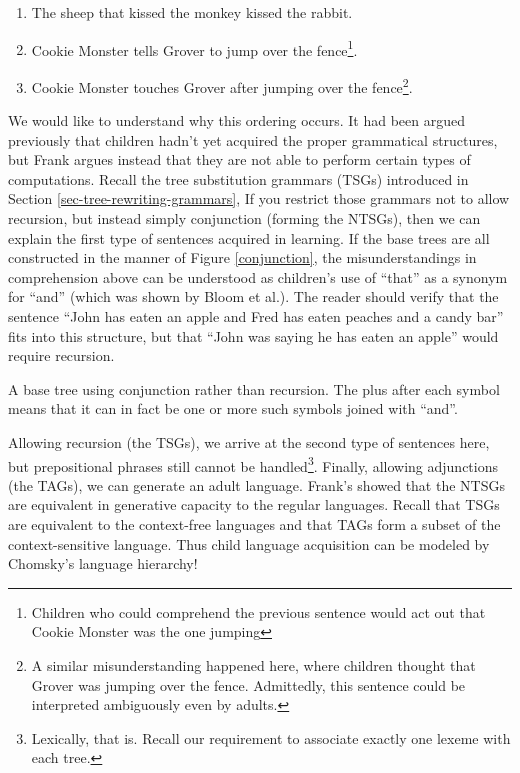 \documentclass[12pt]{article}
\begin{document}
\begin{enumerate}
\item The sheep that kissed the monkey kissed the rabbit.
\item Cookie Monster tells Grover to jump over the
fence\footnote{Children who could comprehend the previous sentence would
act out that Cookie Monster was the one jumping}. 
\item Cookie Monster touches Grover after jumping over the
fence\footnote{A similar misunderstanding happened here, where children
thought that Grover was jumping over the fence.  Admittedly, this
sentence could be interpreted ambiguously even by adults.}.
\end{enumerate}

We would like to understand why this ordering occurs.  It had been
argued previously that children hadn't yet acquired the proper
grammatical structures, but Frank argues instead that they are not able
to perform certain types of computations.  Recall the tree substitution
grammars (TSGs) introduced in Section \ref{sec-tree-rewriting-grammars},
If you restrict those grammars not to allow recursion, but instead
simply conjunction (forming the NTSGs), then we can explain the first
type of sentences acquired in learning. If the base trees are all
constructed in the manner of Figure \ref{conjunction}, the
misunderstandings in comprehension above can be understood as children's
use of ``that'' as a synonym for ``and'' (which was shown by Bloom et
al.).  The reader should verify that the sentence ``John has eaten an
apple and Fred has eaten peaches and a candy bar'' fits into this
structure, but that ``John was saying he has eaten an apple'' would
require recursion.

\begin{Figure}
\begin{center}
\end{center}
\caption{A base tree using conjunction rather than recursion.  The plus
after each symbol means that it can in fact be one or more such symbols
joined with ``and''.}
\label{conjunction}
\end{Figure}

Allowing recursion (the TSGs), we arrive at the second type of sentences
here, but prepositional phrases still cannot be
handled\footnote{Lexically, that is.  Recall our requirement to
associate exactly one lexeme with each tree.}.  Finally, allowing
adjunctions (the TAGs), we can generate an adult language.  Frank's
showed that the NTSGs are equivalent in generative capacity to the
regular languages.  Recall that TSGs are equivalent to the context-free
languages and that TAGs form a subset of the context-sensitive language.
Thus child language acquisition can be modeled by Chomsky's language
hierarchy!
\end{document}
